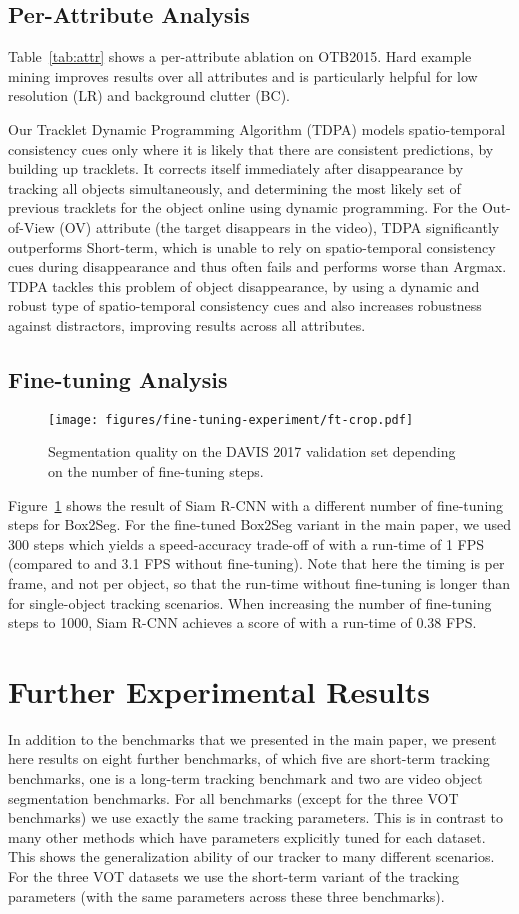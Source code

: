 \documentclass[10pt,twocolumn,letterpaper]{article}
\begin{document}
\subsection{Per-Attribute Analysis}
Table~\ref{tab:attr} shows a per-attribute ablation on OTB2015. Hard example mining improves results over all attributes and is particularly helpful for low resolution (LR) and background clutter (BC).

Our Tracklet Dynamic Programming Algorithm (TDPA) models spatio-temporal consistency cues only where it is likely that there are consistent predictions, by building up tracklets.  It corrects itself immediately after disappearance by tracking all objects simultaneously, and determining the most likely set of previous tracklets for the object online using dynamic programming. For the Out-of-View (OV) attribute (the target disappears in the video), TDPA significantly outperforms Short-term, which is unable to rely on spatio-temporal consistency cues during disappearance and thus often fails and performs worse than Argmax. TDPA tackles this problem of object disappearance, by using a dynamic and robust type of spatio-temporal consistency cues and also increases robustness against distractors, improving results across all attributes.

\subsection{Fine-tuning Analysis}
\begin{figure}
\texttt{[image: figures/fine-tuning-experiment/ft-crop.pdf]}
\caption{\label{fig:ft}Segmentation quality on the DAVIS 2017 validation set depending on the number of fine-tuning steps.}
\end{figure}
Figure~\ref{fig:ft} shows the result of Siam R-CNN with a different number of fine-tuning steps for Box2Seg. For the fine-tuned Box2Seg variant in the main paper, we used 300 steps which yields a speed-accuracy trade-off of  with a run-time of 1 FPS (compared to  and 3.1 FPS without fine-tuning). Note that here the timing is per frame, and not per object, so that the run-time without fine-tuning is longer than for single-object tracking scenarios. When increasing the number of fine-tuning steps to 1000, Siam R-CNN achieves a  score of  with a run-time of 0.38 FPS.

\section{Further Experimental Results}
In addition to the  benchmarks that we presented in the main paper, we present here results on eight further benchmarks, of which five are short-term tracking benchmarks, one is a long-term tracking benchmark and two are video object segmentation benchmarks. For all benchmarks (except for the three VOT benchmarks) we use exactly the same tracking parameters. This is in contrast to many other methods which have parameters explicitly tuned for each dataset. This shows the generalization ability of our tracker to many different scenarios. For the three VOT datasets we use the short-term variant of the tracking parameters (with the same parameters across these three benchmarks).
\end{document}
